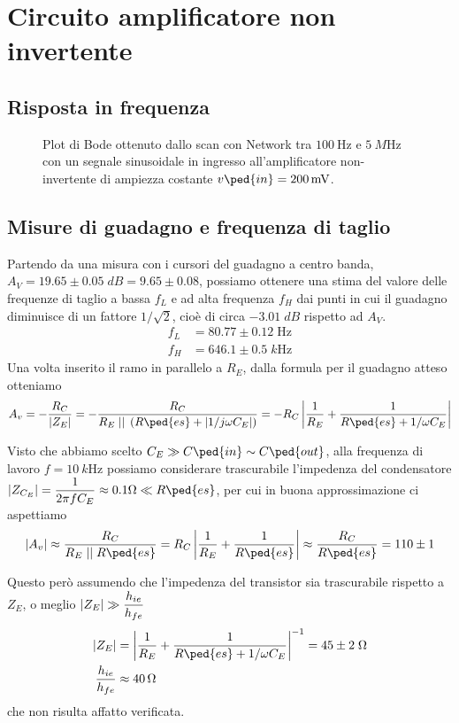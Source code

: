 \documentclass[10pt,a4paper]{article}
\begin{document}
\section{Circuito amplificatore non invertente}
\subsection{Risposta in frequenza}

\begin{figure}[htbp]
\centering
\caption{Plot di Bode ottenuto dallo scan con Network tra $\SI{100}{\Hz}$ e
$\SI{5}{M\Hz}$ con un segnale sinusoidale in ingresso all'amplificatore
non-invertente di ampiezza costante $v\ped{in} = \SI{200}{m\V}$.
\label{fig: ampbode}}
\end{figure}

\subsection{Misure di guadagno e frequenza di taglio}
Partendo da una misura con i cursori del guadagno a centro banda,
$A_V = 19.65 \pm 0.05 \; \si{dB} = 9.65 \pm 0.08$, possiamo ottenere una stima del valore
delle frequenze di taglio a bassa $f_L$ e ad alta frequenza $f_H$ dai punti
in cui il guadagno diminuisce di un fattore $1/\sqrt{2}$, cioè di circa
$-3.01 \; \si{dB}$ rispetto ad $A_V$.
\begin{align*}
f_L &= 80.77 \pm 0.12 \; \si{\Hz}\\
f_H &= 646.1 \pm 0.5 \; \si{k\Hz}
\end{align*}
\iffalse
Una volta inserito il ramo in parallelo a $R_E$, dalla formula per il guadagno
atteso otteniamo
\[
A_v = -\frac{R_C}{\abs{Z_E}} =
- \frac{R_C}{R_E \; \lvert \rvert \; \left(R\ped{es} + \abs{1/j\omega C_E}
\right)} =
- R_C \abs{\frac{1}{R_E} + \frac{1}{R\ped{es} + 1/\omega C_E}}
\]

Visto che abbiamo scelto $C_E \gg C\ped{in} \sim C\ped{out}$, alla frequenza
di lavoro $f = \SI{10}{k\Hz}$ possiamo considerare trascurabile l'impedenza
del condensatore $\abs{Z_{C_E}} = \dfrac{1}{2\pi f C_E} \approx 0.1 \si{\ohm}
\ll R\ped{es}$, per cui in buona approssimazione ci aspettiamo
\[
\abs{A_v} \approx
\frac{R_C}{R_E \; \lvert \rvert \; R\ped{es}} =
R_C \abs{\frac{1}{R_E} + \frac{1}{R\ped{es}}} \approx
\frac{R_C}{R\ped{es}} = 110 \pm 1
\]

Questo però assumendo che l'impedenza del transistor sia trascurabile rispetto
a $Z_E$, o meglio $\left| Z_E \right| \gg \dfrac{h_{ie}}{h_{fe}}$
\begin{align*}
\abs{Z_E} &= \abs{\frac{1}{R_E} + \frac{1}{R\ped{es} + 1/\omega C_E}}^{-1} =
45 \pm 2 \; \si{\ohm} \\
\frac{h_{ie}}{h_{fe}} &\approx \SI{40}{\ohm}
\end{align*}
che non risulta affatto verificata.
\end{document}

